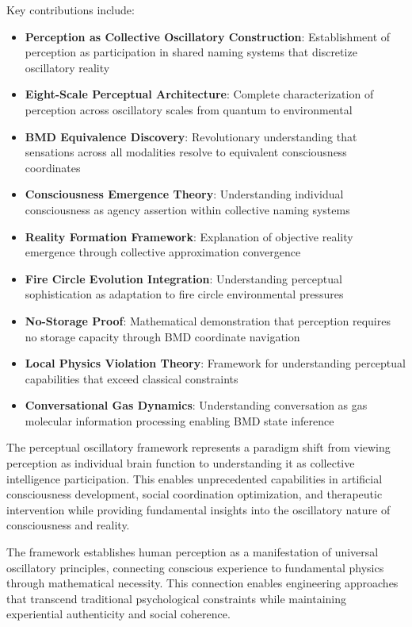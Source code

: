 \documentclass[12pt,a4paper]{article}
\begin{document}
Key contributions include:

\begin{itemize}
\item \textbf{Perception as Collective Oscillatory Construction}: Establishment of perception as participation in shared naming systems that discretize oscillatory reality
\item \textbf{Eight-Scale Perceptual Architecture}: Complete characterization of perception across oscillatory scales from quantum to environmental
\item \textbf{BMD Equivalence Discovery}: Revolutionary understanding that sensations across all modalities resolve to equivalent consciousness coordinates
\item \textbf{Consciousness Emergence Theory}: Understanding individual consciousness as agency assertion within collective naming systems
\item \textbf{Reality Formation Framework}: Explanation of objective reality emergence through collective approximation convergence
\item \textbf{Fire Circle Evolution Integration}: Understanding perceptual sophistication as adaptation to fire circle environmental pressures
\item \textbf{No-Storage Proof}: Mathematical demonstration that perception requires no storage capacity through BMD coordinate navigation
\item \textbf{Local Physics Violation Theory}: Framework for understanding perceptual capabilities that exceed classical constraints
\item \textbf{Conversational Gas Dynamics}: Understanding conversation as gas molecular information processing enabling BMD state inference
\end{itemize}

The perceptual oscillatory framework represents a paradigm shift from viewing perception as individual brain function to understanding it as collective intelligence participation. This enables unprecedented capabilities in artificial consciousness development, social coordination optimization, and therapeutic intervention while providing fundamental insights into the oscillatory nature of consciousness and reality.

The framework establishes human perception as a manifestation of universal oscillatory principles, connecting conscious experience to fundamental physics through mathematical necessity. This connection enables engineering approaches that transcend traditional psychological constraints while maintaining experiential authenticity and social coherence.
\end{document}
